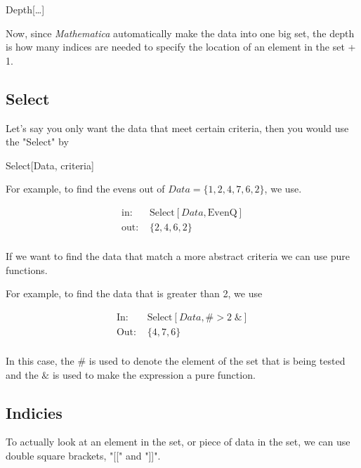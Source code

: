 \documentclass[11pt,a4paper,twoside]{article}
\begin{document}
				\begin{center} Depth[\dots] \end{center}
					
				Now, since \textit{Mathematica} automatically make the data into one big set, the depth is how many indices are needed to specify the location of an element in the set + 1.
					
			\subsection{Select}
					
				Let's say you only want the data that meet certain criteria, then you would use the "Select" by
					
				\begin{center} Select[Data, criteria] \end{center}
					
				For example, to find the evens out of $ Data = \{1,2,4,7,6,2\} $, we use.
					
					\begin{align*}
						\text{in: }& \text{Select}[Data,\text{EvenQ}] \\
						\text{out: }& \{2,4,6,2\} \\
					\end{align*}
					
				If we want to find the data that match a more abstract criteria we can use pure functions.
					
				For example, to find the data that is greater than 2, we use
					
					\begin{align*}					
						\text{In: }& \text{Select} [Data,\# > 2 \; \& ] \\
						\text{Out: }& \{ 4,7,6 \} \\
					\end{align*}
					
				In this case, the $ \# $ is used to denote the element of the set that is being tested and the $ \& $ is used to make the expression a pure function.
					
			\subsection{Indicies}
				
				To actually look at an element in the set, or piece of data in the set, we can use double square brackets, "[[" and "]]".
					
\end{document}
